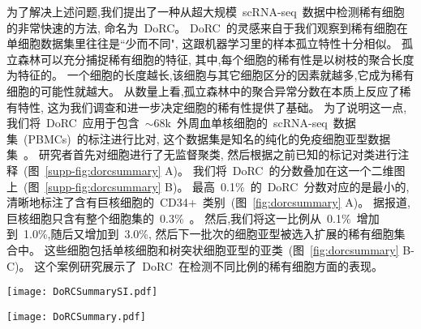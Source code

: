 为了解决上述问题,我们提出了一种从超大规模~scRNA-seq~数据中检测稀有细胞的非常快速的方法,
命名为~DoRC。
DoRC~的灵感来自于我们观察到稀有细胞在单细胞数据集里往往是``少而不同", 这跟机器学习里的样本孤立特性十分相似。
孤立森林可以充分捕捉稀有细胞的特征,
其中,每个细胞的稀有性是以树枝的聚合长度为特征的。
一个细胞的长度越长,该细胞与其它细胞区分的因素就越多,它成为稀有细胞的可能性就越大。
从数量上看,孤立森林中的聚合异常分数在本质上反应了稀有特性,
这为我们调查和进一步决定细胞的稀有性提供了基础。
为了说明这一点,我们将~DoRC~应用于包含~${\sim}68$k~外周血单核细胞的~scRNA-seq~数据集~(PBMCs)~的标注进行比对,
这个数据集是知名的纯化的免疫细胞亚型数据集~\cite{zheng2017massively}。
研究者首先对细胞进行了无监督聚类,
然后根据之前已知的标记对类进行注释~(图~\ref{supp-fig:dorcsummary} A)。
我们将~DoRC~的分数叠加在这一个二维图上~(图~\ref{supp-fig:dorcsummary} B)。
最高~0.1\%~的~DoRC~分数对应的是最小的, 
清晰地标注了含有巨核细胞的~CD34+~类别~(图~\ref{fig:dorcsummary} A)。
据报道,巨核细胞只含有整个细胞集的~0.3\%~\cite{zheng2017massively}。
然后,我们将这一比例从~0.1\%~增加到~1.0\%,随后又增加到~3.0\%,
然后下一批次的细胞亚型被选入扩展的稀有细胞集合中。
这些细胞包括单核细胞和树突状细胞亚型的亚类~(图~\ref{fig:dorcsummary} B-C)。
这个案例研究展示了~DoRC~在检测不同比例的稀有细胞方面的表现。

\begin{figure*}[!htbp]
    \centering
    \texttt{[image: DoRCSummarySI.pdf]}
    \caption{
    DoRC~在~PBMCs\_68k~上的性能评估。
    (A)~基于~t-SNE~的二维嵌入数据集可视化图,按~Zheng~等所报道的鉴定的不同类别用不同的颜色标记。
    (B)~PBMCs\_68k~上细胞的~DoRC~得分热图。巨核细胞群~(0.3\%),是所有细胞类型中最稀有的细胞,获得了最高的~DoRC~分数。
    (C)~使用~IQR~阈值标准后~DoRC~识别的稀有细胞。
    }
    \label{supp-fig:dorcsummary}
\end{figure*}

\begin{figure*}[!htbp]
    \centering
    \texttt{[image: DoRCSummary.pdf]}
    \caption{
    DoRC~发现了不同稀有度的细胞。在~${\sim}68$k~PBMC~数据~\cite{zheng2017massively}~中,不同级别的稀有度对应了一个数量不断增加的稀有细胞群。
    (A-C)~根据~DoRC~得分选出的前~0.1\%、1.0\%~和~3.0\%~的细胞分别以高亮显示。    
    }
    \label{fig:dorcsummary}
\end{figure*}

